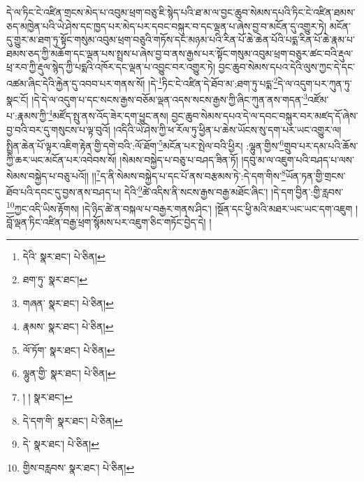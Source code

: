 དེ་ལ་ཏིང་ངེ་འཛིན་གྲངས་མེད་པ་འབུམ་ཕྲག་བཅུ་ཇི་སྙེད་པའི་ཐ་མ་ལ་བྱང་ཆུབ་སེམས་དཔའི་ཏིང་ངེ་འཛིན་ཐམས་ཅད་མཁྱེན་པའི་ཡེ་ཤེས་དང་ཁྱད་པར་མེད་པར་དབང་བསྐུར་བ་དང་ལྡན་པ་ཞེས་བྱ་བ་མངོན་དུ་འགྱུར་ཏེ། མངོན་དུ་གྱུར་མ་ཐག་ཏུ་སྟོང་གསུམ་འབུམ་ཕྲག་བཅུའི་གཏོས་དང་མཉམ་པའི་རིན་པོ་ཆེ་ཆེན་པོའི་པདྨ་རིན་པོ་ཆེ་རྣམ་པ་ཐམས་ཅད་ཀྱི་མཆོག་དང་ལྡན་པས་སྤྲས་པ་ཞེས་བྱ་བ་ནས་རྒྱས་པར་སྟོང་གསུམ་འབུམ་ཕྲག་བཅུར་ཚང་བའི་རྡུལ་ཕྲ་རབ་ཀྱི་རྡུལ་སྙེད་ཀྱི་པདྨའི་འཁོར་དང་ལྡན་པ་འབྱུང་བར་འགྱུར་ཏེ། བྱང་ཆུབ་སེམས་དཔའ་དེའི་ལུས་ཀྱང་དེ་དང་འཚམ་ཞིང་དེའི་རྐྱེན་དུ་འབབ་པར་གནས་སོ། །དེ་\footnote{དེའི་  སྣར་ཐང་།  པེ་ཅིན། }ཏིང་ངེ་འཛིན་དེ་ཐོབ་མ་:ཐག་ཏུ་པདྨ་\footnote{ཐག་ཏུ་  སྣར་ཐང་། }དེ་ལ་འདུག་པར་ཀུན་ཏུ་སྣང་ངོ། །དེ་དེ་ལ་འདུག་པ་དང་སངས་རྒྱས་བཅོམ་ལྡན་འདས་སངས་རྒྱས་ཀྱི་ཞིང་ཀུན་ནས་གདན་\footnote{གཞན་  སྣར་ཐང་།  པེ་ཅིན། }འཛོམ་པ་:རྣམས་ཀྱི་\footnote{རྣམས་  སྣར་ཐང་།  པེ་ཅིན། }མཛོད་སྤུ་ནས་འོད་ཟེར་དག་ཕྱུང་ནས། བྱང་ཆུབ་སེམས་དཔའ་དེ་ལ་དབང་བསྐུར་བར་མཛད་དོ་ཞེས་བྱ་བའི་བར་དུ་གསུངས་པ་ལྟ་བུའོ། །འདིའི་ཡེ་ཤེས་ཀྱི་ཕ་རོལ་ཏུ་ཕྱིན་པ་ཆེས་ཡོངས་སུ་དག་པར་ཡང་འགྱུར་ལ། སྤྲིན་ཆེན་པོ་ལྟར་འཇིག་རྟེན་གྱི་དགེ་བའི་:ལོ་ཐོག་\footnote{ལོ་ཏོག་  སྣར་ཐང་།  པེ་ཅིན། }མངོན་པར་སྤེལ་བའི་ཕྱིར། :ལྷུན་གྱིས་\footnote{ལྷུན་གྱི་  སྣར་ཐང་།  པེ་ཅིན། }གྲུབ་པར་དམ་པའི་ཆོས་ཀྱི་ཆར་ཡང་མངོན་པར་འབེབས་སོ། །སེམས་བསྐྱེད་པ་བཅུ་པ་བཤད་ཟིན་ཏོ། །དབུ་མ་ལ་འཇུག་པའི་བཤད་པ་ལས་སེམས་བསྐྱེད་པ་བཅུ་པའོ།། །།\footnote{། །  སྣར་ཐང་། }ད་ནི་སེམས་བསྐྱེད་པ་དང་པོ་ནས་བརྩམས་ཏེ་:དེ་དག་གིས་\footnote{དེ་དག་གི་  སྣར་ཐང་།  པེ་ཅིན། }ཡོན་ཏན་གྱི་གྲངས་ཐོབ་པའི་དབང་དུ་བྱས་ནས་བཤད་པ། དེའི་\footnote{དེ་  སྣར་ཐང་།  པེ་ཅིན། }ཚེ་འདིས་ནི་སངས་རྒྱས་བརྒྱ་མཐོང་ཞིང་། །དེ་དག་བྱིན་:གྱི་རླབས་\footnote{གྱིས་བརླབས་  སྣར་ཐང་།  པེ་ཅིན། }ཀྱང་འདི་ཡིས་རྟོགས། །དེ་ཉིད་ཚེ་ན་བསྐལ་པ་བརྒྱར་གནས་ཤིང་། །སྔོན་དང་ཕྱི་མའི་མཐར་ཡང་ཡང་དག་འཇུག །བློ་ལྡན་ཏིང་འཛིན་བརྒྱ་ཕྲག་སྙོམས་པར་འཇུག་ཅིང་གཏོང་བྱེད་དེ། །

